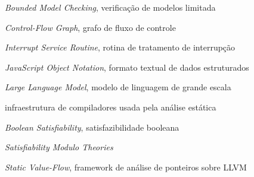 
\listoffigures*
\cleardoublepage

\listofquadros*
\cleardoublepage

\listoftables*
\cleardoublepage

\begin{siglas}
  \item[BMC] \textit{Bounded Model Checking}, verificação de modelos limitada
  \item[CFG] \textit{Control-Flow Graph}, grafo de fluxo de controle
  \item[ISR] \textit{Interrupt Service Routine}, rotina de tratamento de interrupção
  \item[JSON] \textit{JavaScript Object Notation}, formato textual de dados estruturados
  \item[LLM] \textit{Large Language Model}, modelo de linguagem de grande escala
  \item[LLVM] infraestrutura de compiladores usada pela análise estática
  \item[SAT] \textit{Boolean Satisfiability}, satisfazibilidade booleana
  \item[SMT] \textit{Satisfiability Modulo Theories}
  \item[SVF] \textit{Static Value-Flow}, framework de análise de ponteiros sobre LLVM
\end{siglas}

\tableofcontents*
\cleardoublepage
